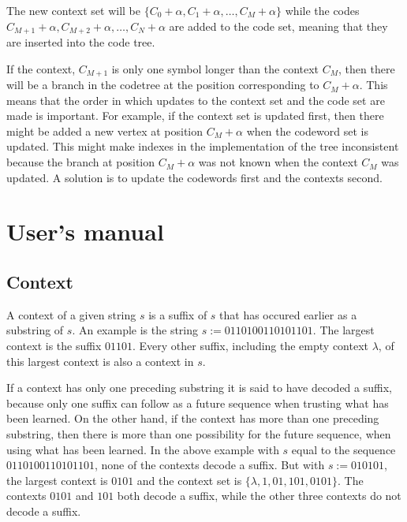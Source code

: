 \documentclass[a4paper,11pt]{report}
\begin{document}
The new context set will be $\{C_0 + \alpha, C_1 + \alpha, \ldots, C_M + \alpha\}$ while the codes
$C_{M+1} + \alpha, C_{M+2} + \alpha, \ldots, C_N + \alpha$ are added to the code set,
meaning that they are inserted into the code tree.

If the context, $C_{M+1}$ is only one symbol longer than the context $C_M$, then there will be
a branch in the codetree at the position corresponding to $C_M + \alpha$. This means that the
order in which updates to the context set and the code set are made is important. For example,
if the context set is updated first, then there might be added a new vertex at position
$C_M + \alpha$ when the codeword set is updated. This might make indexes in the implementation
of the tree inconsistent because the branch at position $C_M + \alpha$ was not known when
the context $C_M$ was updated. A solution is to update the codewords first and the contexts second.

\chapter{User's manual}
\section{Context}
A context of a given string $s$ is a suffix of $s$ that has occured earlier as a substring of $s$.
An example is the string $s := 0110100110101101$. The largest context is the suffix $01101$.
Every other suffix, including the empty context $\lambda$, of this largest context is also a context
in $s$.

If a context has only one preceding substring it is said to have decoded a suffix, because only one
suffix can follow as a future sequence when trusting what has been learned. On the other hand, if
the context has more than one preceding substring, then there is more than one possibility for the
future sequence, when using what has been learned. In the above example with $s$ equal to the sequence
$0110100110101101$, none of the contexts decode a suffix. But with $s := 010101$, the largest context
is $0101$ and the context set is $\{\lambda, 1, 01, 101, 0101\}$. The contexts $0101$ and $101$ both
decode a suffix, while the other three contexts do not decode a suffix.
\end{document}
